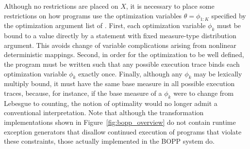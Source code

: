 %
%

Although no restrictions are placed on $X$, it is necessary to place some restrictions on how programs  use the optimization variables $\theta = \phi_{1:K}$ specified by the optimization argument list of .
First, each optimization variable $\phi_k$ must be bound to a value directly by a \sample statement with fixed measure-type distribution argument.
This avoids change of variable complications arising from nonlinear deterministic mappings.  
Second, in order for the optimization to be well defined, the program must be written such that any possible execution trace binds each optimization variable $\phi_k$ exactly once.  
Finally, although any $\phi_k$ may be lexically multiply bound, it must have the same base measure in all possible execution traces, because, for instance, if the base measure of a $\phi_k$ were to change from Lebesgue to counting, the notion of optimality would no longer admit a conventional interpretation.
Note that although the transformation implementations shown in Figure~\ref{fig:bopp_overview}  do not contain runtime exception generators that disallow continued execution of programs that violate these constraints,  those actually implemented in the BOPP system do.

